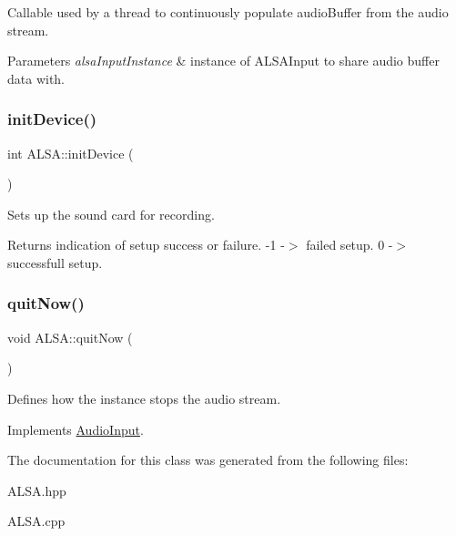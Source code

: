 Callable used by a thread to continuously populate audio\+Buffer from the audio stream. 
\begin{DoxyParams}{Parameters}
{\em alsa\+Input\+Instance} & instance of A\+L\+S\+A\+Input to share audio buffer data with. \\
\hline
\end{DoxyParams}
\hypertarget{classALSA_a875434b9aa77a5c72fa8bb5e6d7e6e82}{}\label{classALSA_a875434b9aa77a5c72fa8bb5e6d7e6e82} 
\subsubsection{\texorpdfstring{init\+Device()}{initDevice()}}
{\ttfamily int A\+L\+S\+A\+::init\+Device (\begin{DoxyParamCaption}{ }\end{DoxyParamCaption})}

Sets up the sound card for recording. \begin{DoxyReturn}{Returns}
indication of setup success or failure. -\/1 -\/$>$ failed setup. 0 -\/$>$ successfull setup. 
\end{DoxyReturn}
\hypertarget{classALSA_a69dea83cc1785dd4c88bd1a9a02ac4b3}{}\label{classALSA_a69dea83cc1785dd4c88bd1a9a02ac4b3} 
\subsubsection{\texorpdfstring{quit\+Now()}{quitNow()}}
{\ttfamily void A\+L\+S\+A\+::quit\+Now (\begin{DoxyParamCaption}{ }\end{DoxyParamCaption})\hspace{0.3cm}{\ttfamily [virtual]}}

Defines how the instance stops the audio stream. 

Implements \hyperlink{classAudioInput_a4fce5476455b1df813f1cb6eebb08311}{Audio\+Input}.



The documentation for this class was generated from the following files\+:\begin{DoxyCompactItemize}
\item 
A\+L\+S\+A.\+hpp\item 
A\+L\+S\+A.\+cpp\end{DoxyCompactItemize}
